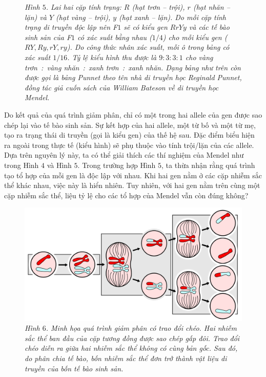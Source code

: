 \begin{multicols}{2}
\begin{figure}[H]
		\caption{\small\textit{\color{timhieukhoahoc}Hình $5$. Lai hai cặp tính trạng: $R$ (hạt trơn -- trội), $r$ (hạt nhăn -- lặn) và $Y$ (hạt vàng -- trội), $y$ (hạt xanh -- lặn). Do mỗi cặp tính trạng di truyền độc lập nên F$1$ sẽ có kiểu gen $RrYy$ và các tế bào sinh sản của F$1$ có xác suất bằng nhau ($1/4$) cho mỗi kiểu gen ($RY, Ry, rY, ry$). Do công thức nhân xác suất, mỗi ô trong bảng có xác suất $1/16$. Tỷ lệ kiểu hình thu được là $9 : 3 : 3 : 1$ cho vàng trơn~:~vàng nhăn~:~xanh trơn~:~xanh nhăn. Dạng bảng như trên còn được gọi là bảng Punnet theo tên nhà di truyền học Reginald Punnet, đồng tác giả cuốn sách của William Bateson về di truyền học Mendel.}}
		\vspace*{-10pt}
	\end{figure}
	Do kết quả của quá trình giảm phân, chỉ có một trong hai allele của gen được sao chép lại vào tế bào sinh sản. Sự kết hợp của hai allele, một từ bố và một từ mẹ, tạo ra trạng thái di truyền (gọi là kiểu gen) của thế hệ sau. Đặc điểm biểu hiện ra ngoài trong thực tế (kiểu hình) sẽ phụ thuộc vào tính trội/lặn của các allele. Dựa trên nguyên lý này, ta có thể giải thích các thí nghiệm của Mendel như trong Hình $4$ và Hình $5$.  
	\vskip 0.1cm
	Trong trường hợp Hình $5$, ta thừa nhận rằng quá trình tạo tổ hợp của mỗi gen là độc lập với nhau. Khi hai gen nằm ở các cặp nhiễm sắc thể khác nhau, việc này là hiển nhiên. Tuy nhiên, với hai gen nằm trên cùng một cặp nhiễm sắc thể, liệu tỷ lệ cho các tổ hợp của Mendel vẫn còn đúng không?
	\begin{figure}[H]
		\centering
		\vspace*{-10pt}
		\captionsetup{labelformat= empty, justification=centering}
		\includegraphics[width=1\linewidth]{image007}
		\caption{\small\textit{\color{timhieukhoahoc}Hình $6$. Minh họa quá trình giảm phân có trao đổi chéo. Hai nhiễm sắc thể ban đầu của cặp tương đồng được sao chép gấp đôi. Trao đổi chéo diễn ra giữa hai nhiễm sắc thể không có cùng bản gốc. Sau đó, do phân chia tế bào, bốn nhiễm sắc thể đơn trở thành vật liệu di truyền của bốn tế bào sinh sản.}}

\end{figure}
\end{multicols}
